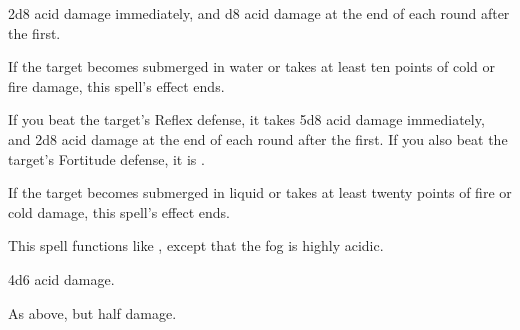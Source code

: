 \begin{spellsuccess}
    2d8 acid damage immediately, and d8 acid damage at the end of each round after the first.
\end{spellsuccess}
\begin{spellnotes}
    If the target becomes submerged in water or takes at least ten points of cold or fire damage, this spell's effect ends.
\end{spellnotes}

\begin{spellsuccess}
    If you beat the target's Reflex defense, it takes 5d8 acid damage immediately, and 2d8 acid damage at the end of each round after the first. If you also beat the target's Fortitude defense, it is \vulnerable.
\end{spellsuccess}
\begin{spellnotes}
    If the target becomes submerged in liquid or takes at least twenty points of fire or cold damage, this spell's effect ends.
\end{spellnotes}

\spelldur{\durshort}
\begin{spelleffect}
    This spell functions like , except that the fog is highly acidic.
\end{spelleffect}
\begin{spellsuccess}
    4d6 acid damage.
\end{spellsuccess}
\begin{spellfailure}
    As above, but half damage.
\end{spellfailure}

